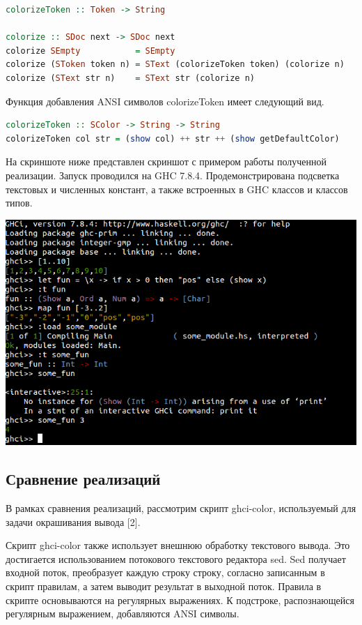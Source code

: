\begin{lstlisting}[language=Haskell, caption=Окрашивание выражения]
colorizeToken :: Token -> String

colorize :: SDoc next -> SDoc next
colorize SEmpty           = SEmpty
colorize (SToken token n) = SText (colorizeToken token) (colorize n)
colorize (SText str n)    = SText str (colorize n)
\end{lstlisting}

Функция добавления ANSI символов colorizeToken имеет следующий вид.
\begin{lstlisting}[language=Haskell]
colorizeToken :: SColor -> String -> String
colorizeToken col str = (show col) ++ str ++ (show getDefaultColor)
\end{lstlisting}

На скриншоте ниже представлен скриншот с примером работы полученной реализации. Запуск проводился на GHC 7.8.4. Продемонстрирована подсветка текстовых и численных констант, а также встроенных в GHC классов и классов типов.

\centerline{\includegraphics[scale=0.75]{img/example.png}}

\subsection{Сравнение реализаций}
В рамках сравнения реализаций, рассмотрим скрипт ghci-color, используемый для задачи окрашивания вывода [2].

Скрипт ghci-color также использует внешнюю обработку текстового вывода. Это достигается использованием потокового текстового редактора sed. Sed получает входной поток, преобразует каждую строку строку, согласно записанным в скрипт правилам, а затем выводит результат в выходной поток. Правила в скрипте основываются на регулярных выражениях. К подстроке, распознающейся регулярным выражением, добавляются ANSI символы.

